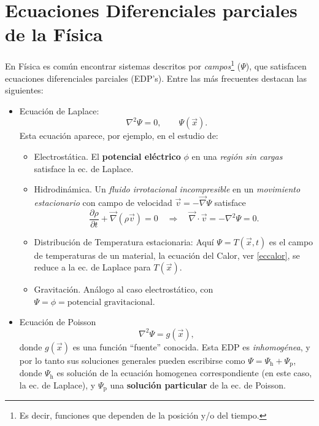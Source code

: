 \chapter{Ecuaciones Diferenciales parciales de la Física}

En Física es común encontrar sistemas descritos por \textit{campos}\footnote{Es decir, funciones que dependen de la posición y/o del tiempo.} ($\Psi$), que satisfacen ecuaciones diferenciales parciales (EDP's). Entre las más
frecuentes destacan las siguientes:
\begin{itemize}
\item Ecuación de Laplace: 
\begin{equation}
\nabla^2\Psi=0, \qquad \Psi(\vec{x}).
\end{equation}
 Esta ecuación aparece, por ejemplo, en el estudio de:
	\begin{itemize}
	\item Electrostática. El \textbf{potencial eléctrico} $\phi$ en una \textit{región sin cargas} satisface la ec. de Laplace.
	\item Hidrodinámica. Un \textit{fluido irrotacional incompresible} en un \textit{movimiento estacionario} con campo de velocidad $\vec{v}=-\vec\nabla\Psi$ satisface
	\begin{equation}
	\frac{\partial\rho}{\partial t}+\vec\nabla (\rho\vec{v})=0 \quad\Rightarrow\quad
	\vec\nabla\cdot\vec{v}=-\nabla^2\Psi=0.
	\end{equation}
	\item Distribución de Temperatura estacionaria: Aquí $\Psi=T(\vec{x},t)$ es el campo de temperaturas de un material, la ecuación del Calor, ver \eqref{eccalor},  se reduce a la ec. de Laplace para $T(\vec{x})$.
	\item Gravitación. Análogo al caso electrostático, con $\Psi=\phi=\text{potencial gravitacional}$.
	\end{itemize}
\item Ecuación de Poisson
\begin{equation}
\nabla^2\Psi=g(\vec{x}),
\end{equation}
donde $g(\vec{x})$ es una función ``fuente'' conocida. Esta EDP es \textit{inhomogénea}, y por lo tanto sus soluciones generales pueden escribirse como $\Psi=\Psi_\text{h}+\Psi_\text{p}$, donde $\Psi_\text{h}$ es solución de la ecuación homogenea correspondiente (en este caso, la ec. de Laplace), y $\Psi_\text{p}$ una \textbf{solución particular} de la ec. de Poisson.


\end{itemize}
